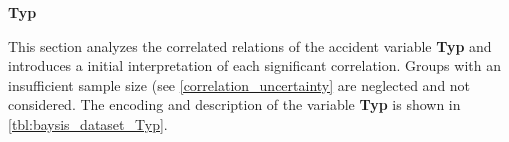\Large
\centerline{\textbf{Typ}}
\normalsize
This section analyzes the correlated relations of the accident variable \textbf{Typ} and introduces a initial interpretation of each significant correlation. Groups with an insufficient sample size (see \cref{correlation_uncertainty} are neglected and not considered. The encoding and description of the variable \textbf{Typ} is shown in \cref{tbl:baysis_dataset_Typ}.

